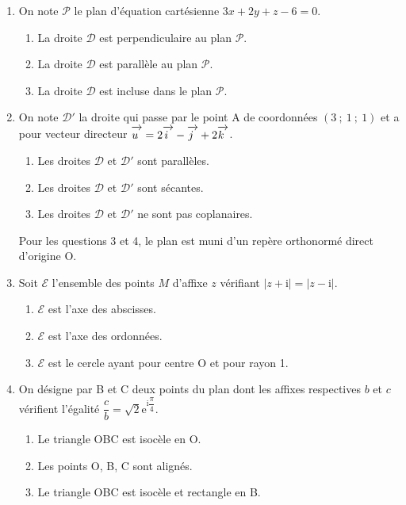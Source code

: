 \documentclass[10pt]{article}
\newcommand{\vect}[1]{\mathchoice%
{\overrightarrow{\displaystyle\mathstrut#1\,\,}}%
{\overrightarrow{\textstyle\mathstrut#1\,\,}}%
{\overrightarrow{\scriptstyle\mathstrut#1\,\,}}%
{\overrightarrow{\scriptscriptstyle\mathstrut#1\,\,}}}
\begin{document}
\medskip
  
\begin{enumerate}
\item On note $\mathcal{P}$ le plan d'équation cartésienne $3x + 2y + z - 6 = 0$. 
	\begin{enumerate}
		\item La droite $\mathcal{D}$ est perpendiculaire au plan $\mathcal{P}$. 
		\item La droite $\mathcal{D}$ est parallèle au plan $\mathcal{P}$. 
		\item La droite $\mathcal{D}$ est incluse dans le plan $\mathcal{P}$.
	\end{enumerate} 
\item On note $\mathcal{D}'$ la droite qui passe par le point A de coordonnées $(3~;~1~;~1)$ et a pour vecteur directeur $\vect{u} = 2\vect{i} - \vect{j} + 2\vect{k}$. 
	\begin{enumerate}
		\item Les droites $\mathcal{D}$ et $\mathcal{D}'$ sont parallèles. 
		\item Les droites $\mathcal{D}$ et $\mathcal{D}'$ sont sécantes. 
		\item Les droites $\mathcal{D}$ et $\mathcal{D}'$ ne sont pas coplanaires.
	\end{enumerate}
	 
\hspace{-0.8cm}Pour les questions 3 et 4, le plan est muni d'un repère orthonormé direct d'origine O.

\medskip
 
\item Soit $\mathcal{E}$ l'ensemble des points $M$ d'affixe $z$ vérifiant $|z + \text{i}| = |z - \text{i}|$.
	\begin{enumerate}
		\item $\mathcal{E}$ est l'axe des abscisses. 
		\item $\mathcal{E}$ est l'axe des ordonnées. 
		\item $\mathcal{E}$ est le cercle ayant pour centre O et pour rayon 1.
	\end{enumerate} 
\item On désigne par B et C deux points du plan dont les affixes respectives $b$ et $c$ vérifient l'égalité $\dfrac{c}{b} = \sqrt{2}\text{e}^{\text{i}\dfrac{\pi}{4}}$. 
	\begin{enumerate}
		\item Le triangle OBC est isocèle en O. 
		\item Les points O, B, C sont alignés. 
		\item Le triangle OBC est isocèle et rectangle en B.
	\end{enumerate} 
\end{enumerate}
\end{document}

